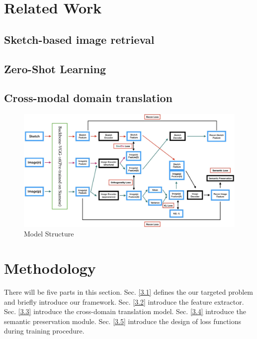 \documentclass[10pt,twocolumn,letterpaper]{article}
\begin{document}

\section{Related Work}

\subsection{Sketch-based image retrieval}

\subsection{Zero-Shot Learning}

\subsection{Cross-modal domain translation}


\begin{figure}
\begin{center}
\includegraphics[width=0.95\linewidth]{model_structure.jpg}
\end{center}
   \caption{Model Structure}
\label{fig:short}
\end{figure}

\section{Methodology}
There will be five parts in this section. 
Sec. \ref{3.1} defines the our targeted problem and briefly introduce our framework. 
Sec. \ref{3.2} introduce the feature extractor. 
Sec. \ref{3.3} introduce the cross-domain translation model.
Sec. \ref{3.4} introduce the semantic preservation module. 
Sec. \ref{3.5} introduce the design of loss functions during training procedure.
\end{document}
